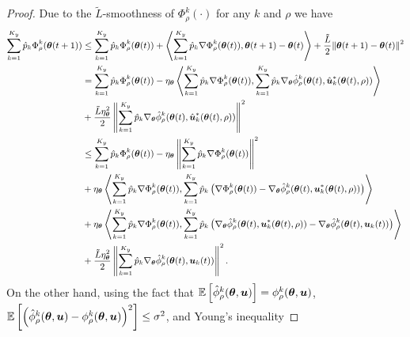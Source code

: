 \begin{proof}
	Due to the $\tilde{L}$-smoothness of $\Phi_{\rho}^{k}(\cdot)$ for any $k$ and $\rho$ we have 
	\begin{equation}\label{eq:Lip expansion}
		\small
		\begin{aligned}
			\sum\limits_{k=1}^{K_{y}}\hat{p}_{k}\Phi_{\rho}^{k}(\btheta(t + 1)) & \leq \sum\limits_{k=1}^{K_{y}}\hat{p}_{k}\Phi_{\rho}^{k}(\btheta(t)) +  \left\langle\sum\limits_{k=1}^{K_{y}}\hat{p}_{k}\nabla\Phi_{\rho}^{k}(\btheta(t)), \btheta(t + 1) - \btheta(t)\right\rangle + \frac{\tilde{L}}{2}\|\btheta(t + 1) - \btheta(t)\|^{2} \\
			& = \sum\limits_{k=1}^{K_{y}}\hat{p}_{k}\Phi_{\rho}^{k}(\btheta(t)) - \eta_{\btheta}\left\langle\sum\limits_{k=1}^{K_{y}}\hat{p}_{k}\nabla\Phi_{\rho}^{k}(\btheta(t)), \sum\limits_{k = 1}^{K_{y}}\hat{p}_{k}\nabla_{\btheta}\hat{\phi}_{\rho}^{k}(\btheta(t), \hat{\bu}_{k}^{*}(\btheta(t), \rho))\right\rangle \\
			& + \frac{\tilde{L}\eta_{\btheta}^{2}}{2}\left\|\sum\limits_{k = 1}^{K_{y}}\hat{p}_{k}\nabla_{\btheta}\hat{\phi}_{\rho}^{k}(\btheta(t), \hat{\bu}_{k}^{*}(\btheta(t), \rho))\right\|^{2} \\
			& \leq \sum\limits_{k=1}^{K_{y}}\hat{p}_{k}\Phi_{\rho}^{k}(\btheta(t)) - \eta_{\btheta}\left\|\sum\limits_{k=1}^{K_{y}}\hat{p}_{k}\nabla\Phi_{\rho}^{k}(\btheta(t))\right\|^{2} \\
			& + \eta_{\btheta}\left\langle\sum\limits_{k=1}^{K_{y}}\hat{p}_{k}\nabla\Phi_{\rho}^{k}(\btheta(t)), \sum\limits_{k=1}^{K_{y}}\hat{p}_{k}\left(\nabla\Phi_{\rho}^{k}(\btheta(t)) - \nabla_{\btheta}\hat{\phi}_{\rho}^{k}(\btheta(t), \bu_{k}^{*}(\btheta(t), \rho))\right)\right\rangle \\
			& + \eta_{\btheta}\left\langle\sum\limits_{k=1}^{K_{y}}\hat{p}_{k}\nabla\Phi_{\rho}^{k}(\btheta(t)), \sum\limits_{k=1}^{K_{y}}\hat{p}_{k}\left(\nabla_{\btheta}\hat{\phi}_{\rho}^{k}(\btheta(t), \bu_{k}^{*}(\btheta(t), \rho)) - \nabla_{\btheta}\hat{\phi}_{\rho}^{k}(\btheta(t), \bu_{k}(t))\right)\right\rangle \\
			& + \frac{\tilde{L}\eta_{\btheta}^{2}}{2}\left\|\sum\limits_{k = 1}^{K_{y}}\hat{p}_{k}\nabla_{\btheta}\hat{\phi}_{\rho}^{k}(\btheta(t), \bu_{k}(t))\right\|^{2}. 
		\end{aligned}
	\end{equation}
	On the other hand, using the fact that $\mathbb{E}\left[\hat{\phi}_{\rho}^{k}(\text{\boldmath{$\theta$}}, \boldsymbol{u})\right] = \phi_{\rho}^{k}(\text{\boldmath{$\theta$}}, \boldsymbol{u})$, $\mathbb{E}\left[\left(\hat{\phi}_{\rho}^{k}(\text{\boldmath{$\theta$}}, \boldsymbol{u}) - \phi_{\rho}^{k}(\text{\boldmath{$\theta$}}, \boldsymbol{u})\right)^{2}\right] \leq \sigma^{2}$, and Young's inequality

\end{proof}
